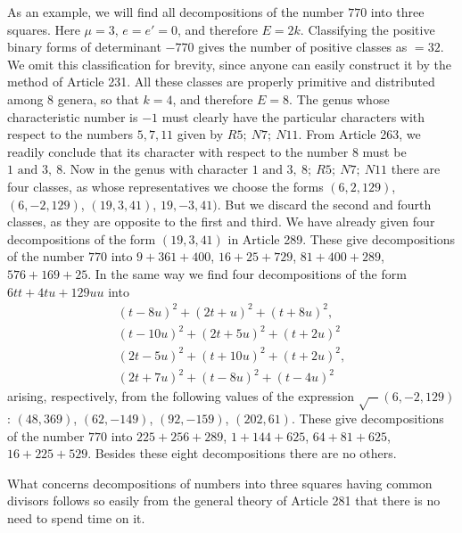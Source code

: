 As an example, we will find all decompositions of the number \(770\)
into three squares. Here \(\mu=3\), \(e=e'=0\), and therefore \(E=2k\).
Classifying the positive binary forms of determinant \(-770\) gives
the number of positive classes as \(=32\). We omit this classification
for brevity, since anyone can easily construct it by the method of
Article 231. All these classes are properly primitive and distributed
among \(8\) genera, so that \(k=4\), and therefore \(E=8\). The
genus whose characteristic number is \(-1\) must clearly have the
particular characters with respect to the numbers \(5,7,11\) given by
\(R5;\ N7;\ N11\).
From Article 263, we readily conclude that its character with respect
to the number \(8\) must be \(1\text{ and }3,\ 8\). Now in the genus with character
\(1\text{ and }3,\ 8;\ R5;\ N7;\ N11\) there are four classes, as whose representatives we choose
the forms \((6,2,129)\), \((6,-2,129)\), \((19,3,41)\), \(19,-3,41)\). But we discard the
second and fourth classes, as they are opposite to the first and third.
We have already given four decompositions of the form \((19,3,41)\) in
Article 289. These give decompositions of the number \(770\) into
\(9+361+400\), \(16+25+729\), \(81+400+289\), \(576+169+25\). In the same way we find four
decompositions of the form \(6tt+4tu+129uu\) into
\[
\begin{gathered}
(t-8u)^2+(2t+u)^2+(t+8u)^2,\\
(t-10u)^2+(2t+5u)^2+(t+2u)^2\\
(2t-5u)^2+(t+10u)^2+(t+2u)^2,\\
(2t+7u)^2+(t-8u)^2+(t-4u)^2
\end{gathered}
\]
arising, respectively, from the following values of the expression
\(\surd-(6,-2,129)\): \((48,369)\), \((62,-149)\), \((92,-159)\), \((202,61)\). These give decompositions
of the number \(770\) into \(225+256+289\), \(1+144+625\), \(64+81+625\), \(16+225+529\).
Besides these eight decompositions there are no others.

What concerns decompositions of numbers into three squares having
common divisors follows so easily from the general theory of Article
281 that there is no need to spend time on it.

